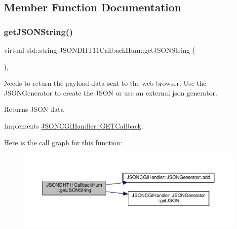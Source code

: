 \subsection{Member Function Documentation}
\mbox{\label{classJSONDHT11CallbackHum_acc4cc41772967e063e1364d7c92ab985}} 
\subsubsection{\texorpdfstring{get\+J\+S\+O\+N\+String()}{getJSONString()}}
{\footnotesize\ttfamily virtual std\+::string J\+S\+O\+N\+D\+H\+T11\+Callback\+Hum\+::get\+J\+S\+O\+N\+String (\begin{DoxyParamCaption}{ }\end{DoxyParamCaption})\hspace{0.3cm}{\ttfamily [inline]}, {\ttfamily [virtual]}}

Needs to return the payload data sent to the web browser. Use the J\+S\+O\+N\+Generator to create the J\+S\+ON or use an external json generator. \begin{DoxyReturn}{Returns}
J\+S\+ON data 
\end{DoxyReturn}


Implements \hyperlink{classJSONCGIHandler_1_1GETCallback_a2367bf5a5912e9e5599ee464e0846255}{J\+S\+O\+N\+C\+G\+I\+Handler\+::\+G\+E\+T\+Callback}.

Here is the call graph for this function\+:
\nopagebreak
\begin{figure}[H]
\begin{center}
\leavevmode
\includegraphics[width=350pt]{classJSONDHT11CallbackHum_acc4cc41772967e063e1364d7c92ab985_cgraph}
\end{center}
\end{figure}



